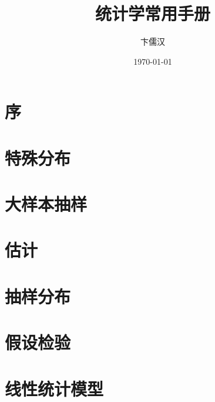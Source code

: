 \documentclass[cn,single]{elegantbook}
\title{统计学常用手册}
\author{卞儒汉}
\date{\today}
\begin{document}

\tableofcontents
%

\chapter*{序}

\chapter{特殊分布}
	
	
	
	
	

\chapter{大样本抽样}
	
	

\chapter{估计}
	

\chapter{抽样分布}
	
	
	
	

\chapter{假设检验}
	
	

\chapter{线性统计模型}
	
	
\end{document}
